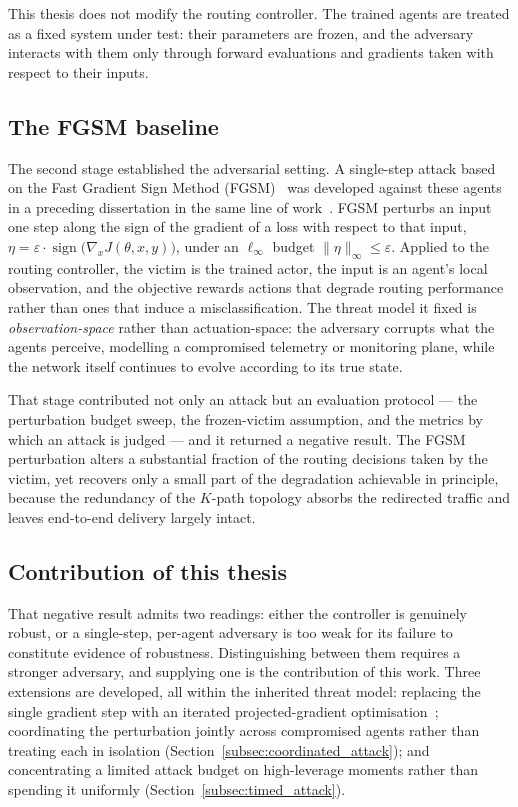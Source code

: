 This thesis does not modify the routing controller. The trained agents are treated
as a fixed system under test: their parameters are frozen, and the adversary
interacts with them only through forward evaluations and gradients taken with
respect to their inputs.

\subsection{The FGSM baseline}
\label{subsec:base_fgsm}

The second stage established the adversarial setting. A single-step attack based on
the Fast Gradient Sign Method
(FGSM)~\cite{goodfellow2015explainingharnessingadversarialexamples} was developed
against these agents in a preceding dissertation in the same line of
work~\cite{TODO-colleague-fgsm}. FGSM perturbs an input one step along the sign of
the gradient of a loss with respect to that input,
$\eta = \varepsilon \cdot \operatorname{sign}\!\big(\nabla_x J(\theta, x, y)\big)$,
under an $\ell_\infty$ budget $\lVert \eta \rVert_\infty \le \varepsilon$. Applied
to the routing controller, the victim is the trained actor, the input is an agent's
local observation, and the objective rewards actions that degrade routing
performance rather than ones that induce a misclassification. The threat model it
fixed is \emph{observation-space} rather than actuation-space: the adversary
corrupts what the agents perceive, modelling a compromised telemetry or monitoring
plane, while the network itself continues to evolve according to its true state.

That stage contributed not only an attack but an evaluation protocol --- the
perturbation budget sweep, the frozen-victim assumption, and the metrics by which
an attack is judged --- and it returned a negative result. The FGSM perturbation
alters a substantial fraction of the routing decisions taken by the victim, yet
recovers only a small part of the degradation achievable in principle, because the
redundancy of the $K$-path topology absorbs the redirected traffic and leaves
end-to-end delivery largely intact.

\subsection{Contribution of this thesis}
\label{subsec:contribution_scope}

That negative result admits two readings: either the controller is genuinely
robust, or a single-step, per-agent adversary is too weak for its failure to
constitute evidence of robustness. Distinguishing between them requires a stronger
adversary, and supplying one is the contribution of this work. Three extensions are
developed, all within the inherited threat model: replacing the single gradient
step with an iterated projected-gradient
optimisation~\cite{madry2019deeplearningmodelsresistant}; coordinating the
perturbation jointly across compromised agents rather than treating each in
isolation (Section~\ref{subsec:coordinated_attack}); and concentrating a limited
attack budget on high-leverage moments rather than spending it uniformly
(Section~\ref{subsec:timed_attack}).

